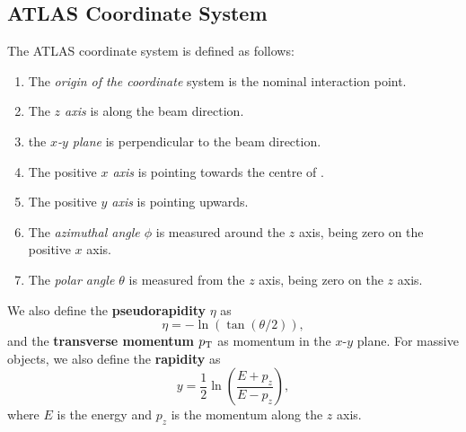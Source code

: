\subsection{ATLAS Coordinate System}
\label{sec:atlas_coord}
The ATLAS coordinate system is defined as follows:
\begin{enumerate}
    \item The \emph{origin of the coordinate} system is the nominal interaction point.
    \item The \emph{$z$ axis} is along the beam direction.
    \item the \emph{$x$-$y$ plane} is perpendicular to the beam direction.
    \item The positive \emph{$x$ axis} is pointing towards the centre of \LHC.
    \item The positive \emph{$y$ axis} is pointing upwards.
    \item The \emph{azimuthal angle $\phi$} is measured around the $z$ axis, being zero on the positive $x$ axis.
    \item The \emph{polar angle $\theta$} is measured from the $z$ axis, being zero on the $z$ axis.
\end{enumerate}
We also define the \textbf{pseudorapidity} $\eta$ as 
\begin{equation}
    \label{eq:pseudorapidity}
    \eta = -\ln(\tan(\theta/2)),
\end{equation}
and the \textbf{transverse momentum} $p_\text{T}$ as momentum in the $x$-$y$ plane.
For massive objects, we also define the \textbf{rapidity} as
\begin{equation}
    \label{eq:rapidity}
    y = \frac{1}{2} \ln\left(\frac{E + p_z}{E - p_z}\right),
\end{equation}
where $E$ is the energy and $p_z$ is the momentum along the $z$ axis.


